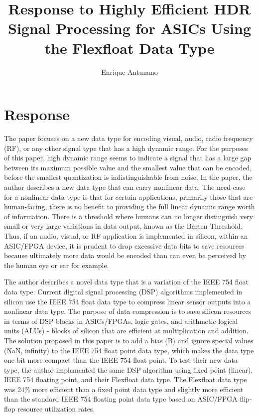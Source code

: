 \documentclass{article}
\title{Response to Highly Efficient HDR Signal Processing for ASICs
Using the Flexfloat Data Type}
\author{Enrique Antunano}
\begin{document}
\maketitle

\section{Response}
The paper focuses on a new data type for encoding visual, audio, radio frequency (RF), or any other signal type that has a high dynamic range. For the purposes of this paper, high dynamic range seems to indicate a signal that has a large gap between its maximum possible value and the smallest value that can be encoded, before the smallest quantization is indistinguishable from noise. In the paper, the author describes a new data type that can carry nonlinear data. The need case for a nonlinear data type is that for certain applications, primarily those that are human-facing, there is no benefit to providing the full linear dynamic range worth of information. There is a threshold where humans can no longer distinguish very small or very large variations in data output, known as the Barten Threshold. Thus, if an audio, visual, or RF application is implemented in silicon, within an ASIC/FPGA device, it is prudent to drop excessive data bits to save resources because ultimately more data would be encoded than can even be perceived by the human eye or ear for example.

The author describes a novel data type that is a variation of the IEEE 754 float data type. Current digital signal processing (DSP) algorithms implemented in silicon use the IEEE 754 float data type to compress linear sensor outputs into a nonlinear data type. The purpose of data compression is to save silicon resources in terms of DSP blocks in ASICs/FPGAs, logic gates, and arithmetic logical units (ALUs) - blocks of silicon that are efficient at multiplication and addition. The solution proposed in this paper is to add a bias (B) and ignore special values (NaN, infinity) to the IEEE 754 float point data type, which makes the data type one bit more compact than the IEEE 754 float point. To test their new data type, the author implemented the same DSP algorithm using fixed point (linear), IEEE 754 floating point, and their Flexfloat data type. The Flexfloat data type was 24\% more efficient than a fixed point data type and slightly more efficient than the standard IEEE 754 floating point data type based on ASIC/FPGA flip-flop resource utilization rates.
\end{document}
